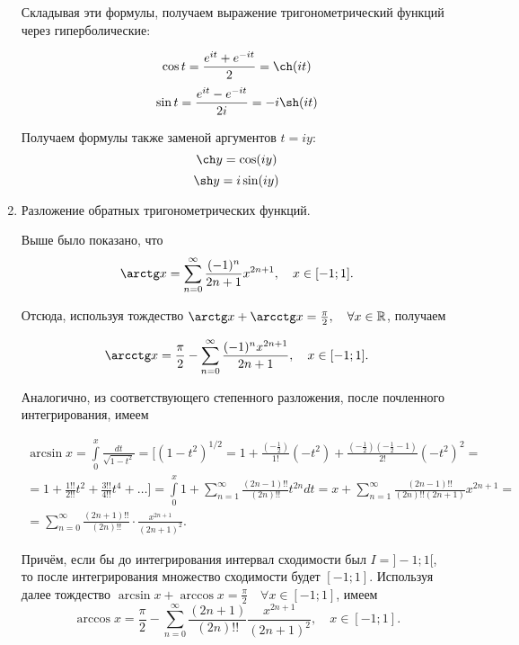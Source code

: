 \documentclass[../../main.tex]{subfiles}
\begin{document}
\begin{enumerate}
        Складывая эти формулы, получаем выражение тригонометрический функций 
        через гиперболические:
        
        \[ \cos t = \frac{e^{it} + e^{-it}}{2} = \ch (it) \]
        \[ \sin t = \frac{e^{it} - e^{-it}}{2i} = -i\sh (it) \]
        
        Получаем формулы также заменой аргументов $t = iy$:
        \[ \ch y = \cos(iy)\]
        \[\sh y = i \sin (iy)\]
        
        \item Разложение обратных тригонометрических функций.
        
        Выше было показано, что 
        \[ \arctg x = \sum\limits_{n = 0}^{\infty} \frac{(-1)^n}{2n + 1}
        x^{2n+1}, \quad x \in [-1;1]. \]
        
        Отсюда, используя тождество $\arctg x + \arcctg x = \frac{\pi}{2}, 
        \quad \forall x \in \R$, получаем 
        
        \[ \arcctg x = \frac{\pi}{2} - \sum\limits_{n = 0}^{\infty} 
        \frac{(-1)^nx^{2n+1}}{2n + 1}, \quad x \in [-1; 1]. \]
        
        Аналогично, из соответствующего степенного разложения, после 
        почленного интегрирования, имеем
	
	    \begin{multline*}
	        \arcsin x = \int\limits_{0}^{x} \frac{dt}{\sqrt{1 - t^2}} =
	        [(1 - t^2)^{1/2} = 1 + \frac{(-\frac12)}{1!}(-t^2) + 
	        \frac{(-\frac12)(-\frac12 - 1)}{2!}(-t^2)^2 = \\ =
            1 + \frac{1!!}{2!!}t^2 + \frac{3!!}{4!!}t^4 + \ldots ] = 
            \int\limits_{0}^{x} 1 + \sum\limits_{n = 1}^{\infty} 
            \frac{(2n-1)!!}{(2n)!!} t^{2n}dt = x + \sum\limits_{n = 1}^{\infty} 
            \frac{(2n-1)!!}{(2n)!!(2n+1)}x^{2n+1} = \\ = 
            \sum\limits_{n = 0}^{\infty} \frac{(2n + 1)!!}{(2n)!!} 
            \cdot \frac{x^{2n+1}}{(2n+1)^2}.
        \end{multline*}
        
        Причём, если бы до интегрирования интервал сходимости был $I = ]-1;1[$, 
        то после интегрирования множество сходимости будет $[-1;1]$.
        Используя далее тождество $\arcsin x + \arccos x = \frac{\pi}{2} \quad 
        \forall x \in [-1; 1]$, имеем \[ \arccos x = \frac{\pi}{2} - 
        \sum\limits_{n = 0}^{\infty} \frac{(2n + 1)}{(2n)!!} 
        \frac{x^{2n + 1}}{(2n + 1)^2}, \quad x \in [-1; 1].\]
        

\end{enumerate}
\end{document}
